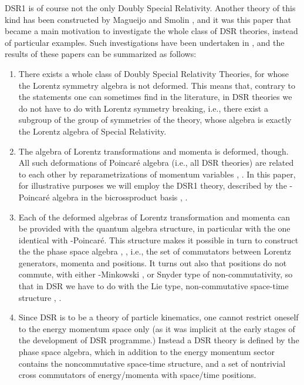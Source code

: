 \documentclass  [12pt] {article}
\begin{document}
 DSR1 is of course not the only Doubly Special Relativity. Another theory of
this kind has been constructed by Magueijo and Smolin \cite{Magueijo:2001cr},
and it was this paper that became a main motivation to investigate the whole
class of DSR theories, instead of particular examples. Such investigations have
been undertaken in  \cite{juse}, \cite{Kowalski-Glikman:2002jr} and the results
of these papers can be summarized as follows:
\begin{enumerate}
\item There exists a whole class of Doubly Special Relativity Theories, for whose the Lorentz
symmetry algebra is not deformed. This means that, contrary to the statements
one can sometimes find in the literature, in DSR theories we do not have to do
with Lorentz symmetry breaking, i.e., there exist a subgroup of the group of
symmetries of the theory, whose algebra is exactly the Lorentz algebra of
Special Relativity.
\item The algebra of Lorentz transformations and momenta is deformed, though.
 All such deformations of Poincar\'e algebra (i.e., all DSR
theories) are related to each other by reparametrizations of momentum variables
\cite{juse}, \cite{Kowalski-Glikman:2002jr}. In this paper, for illustrative
purposes we will employ the DSR1 theory, described by the \myHighlight{$\kappa$}\coordHE{}-Poincar\'e
algebra in the bicrossproduct basis \cite{kappaP}, \cite{kappaM}.
\item Each of the deformed algebras of Lorentz transformation and momenta can be provided with the
quantum algebra  structure, in particular with the one identical with
\myHighlight{$\kappa$}\coordHE{}-Poincar\'e. This structure makes it possible in turn to construct the
the phase space algebra \cite{crossalg}, \cite{luno}, i.e., the set of
commutators between Lorentz generators, momenta and positions. It turns out
also that positions do not commute, with either \myHighlight{$\kappa$}\coordHE{}-Minkowski
\cite{kappaM}, or Snyder \cite{snyder} type of non-commutativity, so that in
DSR we have to do with the Lie type, non-commutative space-time structure
\cite{lunoDSR}, \cite{Kowalski-Glikman:2002jr}.
\item Since DSR is to be a theory of particle kinematics, one cannot restrict oneself to
the energy momentum space only (as it was implicit at the early stages of the
development of DSR programme.) Instead a DSR theory is defined by the phase
space algebra, which in addition to the energy momentum sector contains the
noncommutative space-time structure, and a  set of nontrivial cross commutators
of energy/momenta with space/time positions.
\end{enumerate}
\end{document}
